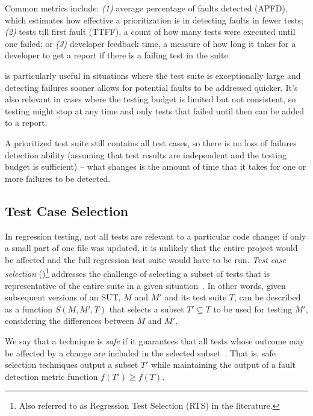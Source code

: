 Common metrics include: \textit{(1)} average percentage of faults detected (APFD), which estimates how effective a prioritization is in detecting faults in fewer tests; \textit{(2)} tests till first fault (TTFF), a count of how many tests were executed until one failed; or \textit{(3)} developer feedback time, a measure of how long it takes for a developer to get a report if there is a failing test in the suite.

\tcp is particularly useful in situations where the test suite is exceptionally large and detecting failures sooner allows for potential faults to be addressed quicker.
It's also relevant in cases where the testing budget is limited but not consistent, so testing might stop at any time and only tests that failed until then can be added to a report.

A prioritized test suite still contains all test cases, 
so there is no loss of failures detection ability (assuming that test results are independent and the testing budget is sufficient) -- what changes is the amount of time that it takes for one or more failures to be detected.


\subsection{Test Case Selection}
\label{sec:tcs}

In regression testing, not all tests are relevant to a particular code change:
if only a small part of one file was updated, it is unlikely that the entire project would be affected and the full regression test suite would have to be run.
\textit{Test case selection} (\tcs)\footnote{Also referred to as Regression Test Selection (RTS) in the literature.} addresses the challenge of selecting a subset of tests that is representative of the entire suite in a given situation~\cite{yoo2012regression, RothermelHarrold94FrameworkForEvaluationRTS}.
In other words, given subsequent versions of an SUT, $M$ and $M'$ and its test suite $T$, 
\tcs can be described as a function $S(M, M', T)$ that selects a subset $T' \subseteq T$ to be used for testing $M'$, considering the differences between $M$ and $M'$.

We say that a \tcs technique is \emph{safe} if it guarantees that all tests whose outcome may be affected by a change are included in the selected subset~\cite{RothermelHarrold94FrameworkForEvaluationRTS}.
That is, safe selection techniques output a subset $T'$ while maintaining the output of a fault detection metric function $f(T') \geq f(T)$.

